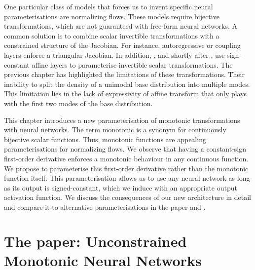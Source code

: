 One particular class of models that forces us to invent specific neural parameterisations are normalizing flows. These models require bijective transformations, which are not guaranteed with free-form neural networks. A common solution is to combine scalar invertible transformations with a constrained structure of the Jacobian. For instance, autoregressive or coupling layers enforce a triangular Jacobian. In addition, \citet{rezende2015variational}, and shortly after \citet{kingma_improved_2016, dinh_density_2017}, use sign-constant affine layers to parameterise invertible scalar transformations. The previous chapter has highlighted the limitations of these transformations. Their inability to split the density of a unimodal base distribution into multiple modes. This limitation lies in the lack of expressivity of affine transform that only plays with the first two modes of the base distribution.

This chapter introduces a new parameterisation of monotonic transformations with neural networks. The term monotonic is a synonym for continuously bijective scalar functions. Thus, monotonic functions are appealing parameterisations for normalizing flows. We observe that having a constant-sign first-order derivative enforces a monotonic behaviour in any continuous function. We propose to parameterise this first-order derivative rather than the monotonic function itself. This parameterisation allows us to use any neural network as long as its output is signed-constant, which we induce with an appropriate output activation function. We discuss the consequences of our new architecture in detail and compare it to alternative parameterisations in the paper and .

%


\section{The paper: Unconstrained Monotonic Neural Networks}
